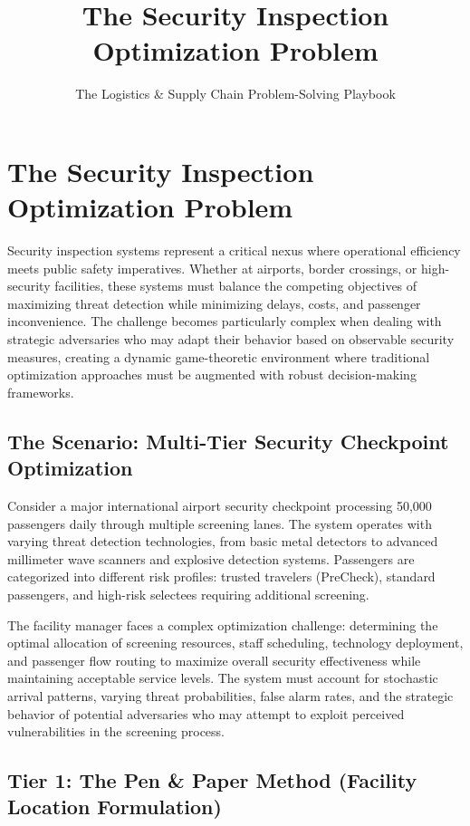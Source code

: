 \documentclass{article}
\title{The Security Inspection Optimization Problem}
\author{The Logistics \& Supply Chain Problem-Solving Playbook}
\date{}
\begin{document}
\maketitle

\section{The Security Inspection Optimization Problem}

Security inspection systems represent a critical nexus where operational efficiency meets public safety imperatives. Whether at airports, border crossings, or high-security facilities, these systems must balance the competing objectives of maximizing threat detection while minimizing delays, costs, and passenger inconvenience. The challenge becomes particularly complex when dealing with strategic adversaries who may adapt their behavior based on observable security measures, creating a dynamic game-theoretic environment where traditional optimization approaches must be augmented with robust decision-making frameworks.

\subsection{The Scenario: Multi-Tier Security Checkpoint Optimization}

Consider a major international airport security checkpoint processing 50,000 passengers daily through multiple screening lanes. The system operates with varying threat detection technologies, from basic metal detectors to advanced millimeter wave scanners and explosive detection systems. Passengers are categorized into different risk profiles: trusted travelers (PreCheck), standard passengers, and high-risk selectees requiring additional screening.

The facility manager faces a complex optimization challenge: determining the optimal allocation of screening resources, staff scheduling, technology deployment, and passenger flow routing to maximize overall security effectiveness while maintaining acceptable service levels. The system must account for stochastic arrival patterns, varying threat probabilities, false alarm rates, and the strategic behavior of potential adversaries who may attempt to exploit perceived vulnerabilities in the screening process.

\subsection{Tier 1: The Pen \& Paper Method (Facility Location Formulation)}
\end{document}
